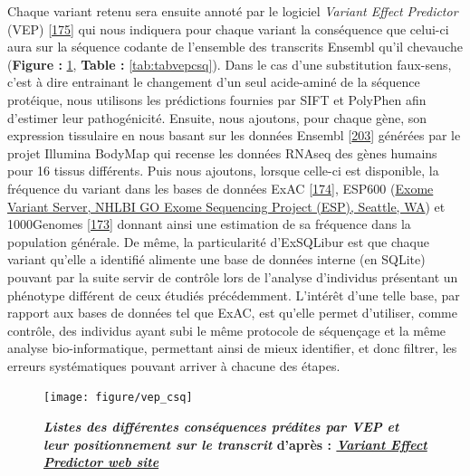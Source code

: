 \documentclass[12pt,a4paper,twoside]{ugathesis}
\theoremstyle{definition}
\theoremstyle{definition}
\theoremstyle{definition}
\theoremstyle{remark}
\begin{document}
Chaque variant retenu sera ensuite annoté par le logiciel \emph{Variant
Effect Predictor} (VEP) {[}\protect\hyperlink{ref-McLaren2016}{175}{]}
qui nous indiquera pour chaque variant la conséquence que celui-ci aura
sur la séquence codante de l'ensemble des transcrits Ensembl qu'il
chevauche (\textbf{Figure : }\ref{fig:pictvepcsq}, \textbf{Table :
}\ref{tab:tabvepcsq}). Dans le cas d'une substitution faux-sens, c'est à
dire entrainant le changement d'un seul acide-aminé de la séquence
protéique, nous utilisons les prédictions fournies par SIFT et PolyPhen
afin d'estimer leur pathogénicité. Ensuite, nous ajoutons, pour chaque
gène, son expression tissulaire en nous basant sur les données Ensembl
{[}\protect\hyperlink{ref-Aken2017}{203}{]} générées par le projet
Illumina BodyMap qui recense les données RNAseq des gènes humains pour
16 tissus différents. Puis nous ajoutons, lorsque celle-ci est
disponible, la fréquence du variant dans les bases de données ExAC
{[}\protect\hyperlink{ref-Lek2016}{174}{]}, ESP600
(\href{http://evs.gs.washington.edu/EVS/}{Exome Variant Server, NHLBI GO
Exome Sequencing Project (ESP), Seattle, WA}) et 1000Genomes
{[}\protect\hyperlink{ref-1000GenomesProjectConsortium2015}{173}{]}
donnant ainsi une estimation de sa fréquence dans la population
générale. De même, la particularité d'ExSQLibur est que chaque variant
qu'elle a identifié alimente une base de données interne (en SQLite)
pouvant par la suite servir de contrôle lors de l'analyse d'individus
présentant un phénotype différent de ceux étudiés précédemment.
L'intérêt d'une telle base, par rapport aux bases de données tel que
ExAC, est qu'elle permet d'utiliser, comme contrôle, des individus ayant
subi le même protocole de séquençage et la même analyse
bio-informatique, permettant ainsi de mieux identifier, et donc filtrer,
les erreurs systématiques pouvant arriver à chacune des étapes.

\begin{figure}

{\centering \texttt{[image: figure/vep\_csq]} 

}

\caption[Listes des différentes conséquences prédites par VEP et leur positionnement sur le transcrit]{\textbf{\emph{Listes des différentes conséquences
prédites par VEP et leur positionnement sur le transcrit} d'après :
\href{http://www.ensembl.org/info/genome/variation/consequences.jpg}{\emph{Variant
Effect Predictor web site}}}}\label{fig:pictvepcsq}
\end{figure}
\end{document}
